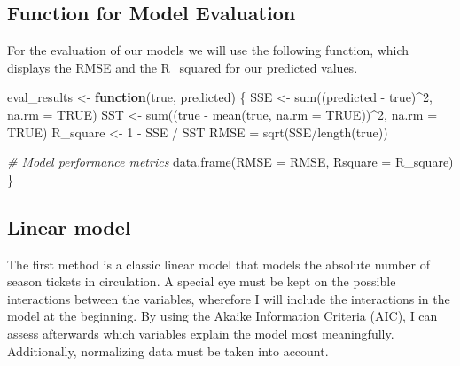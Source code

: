 \documentclass[
]{article}
\newenvironment{Shaded}{\begin{snugshade}}{\end{snugshade}}
\newcommand{\AttributeTok}[1]{\textcolor[rgb]{0.77,0.63,0.00}{#1}}
\newcommand{\CommentTok}[1]{\textcolor[rgb]{0.56,0.35,0.01}{\textit{#1}}}
\newcommand{\ConstantTok}[1]{\textcolor[rgb]{0.00,0.00,0.00}{#1}}
\newcommand{\ControlFlowTok}[1]{\textcolor[rgb]{0.13,0.29,0.53}{\textbf{#1}}}
\newcommand{\DecValTok}[1]{\textcolor[rgb]{0.00,0.00,0.81}{#1}}
\newcommand{\FunctionTok}[1]{\textcolor[rgb]{0.00,0.00,0.00}{#1}}
\newcommand{\NormalTok}[1]{#1}
\newcommand{\OtherTok}[1]{\textcolor[rgb]{0.56,0.35,0.01}{#1}}
\newcommand{\SpecialCharTok}[1]{\textcolor[rgb]{0.00,0.00,0.00}{#1}}
\begin{document}
\hypertarget{function-for-model-evaluation}{%
\subsection{Function for Model
Evaluation}\label{function-for-model-evaluation}}

For the evaluation of our models we will use the following function,
which displays the RMSE and the R\_squared for our predicted values.

\begin{Shaded}
\begin{Highlighting}[]
\NormalTok{eval\_results }\OtherTok{\textless{}{-}} \ControlFlowTok{function}\NormalTok{(true, predicted) \{}
\NormalTok{  SSE }\OtherTok{\textless{}{-}} \FunctionTok{sum}\NormalTok{((predicted }\SpecialCharTok{{-}}\NormalTok{ true)}\SpecialCharTok{\^{}}\DecValTok{2}\NormalTok{, }\AttributeTok{na.rm =} \ConstantTok{TRUE}\NormalTok{)}
\NormalTok{  SST }\OtherTok{\textless{}{-}} \FunctionTok{sum}\NormalTok{((true }\SpecialCharTok{{-}} \FunctionTok{mean}\NormalTok{(true, }\AttributeTok{na.rm =} \ConstantTok{TRUE}\NormalTok{))}\SpecialCharTok{\^{}}\DecValTok{2}\NormalTok{, }\AttributeTok{na.rm =} \ConstantTok{TRUE}\NormalTok{)}
\NormalTok{  R\_square }\OtherTok{\textless{}{-}} \DecValTok{1} \SpecialCharTok{{-}}\NormalTok{ SSE }\SpecialCharTok{/}\NormalTok{ SST}
\NormalTok{  RMSE }\OtherTok{=} \FunctionTok{sqrt}\NormalTok{(SSE}\SpecialCharTok{/}\FunctionTok{length}\NormalTok{(true))}

\CommentTok{\# Model performance metrics}
\FunctionTok{data.frame}\NormalTok{(}\AttributeTok{RMSE =}\NormalTok{ RMSE,}
           \AttributeTok{Rsquare =}\NormalTok{ R\_square)}
\NormalTok{\}}
\end{Highlighting}
\end{Shaded}

\hypertarget{linear-model}{%
\subsection{Linear model}\label{linear-model}}

The first method is a classic linear model that models the absolute
number of season tickets in circulation. A special eye must be kept on
the possible interactions between the variables, wherefore I will
include the interactions in the model at the beginning. By using the
Akaike Information Criteria (AIC), I can assess afterwards which
variables explain the model most meaningfully. Additionally, normalizing
data must be taken into account.
\end{document}
